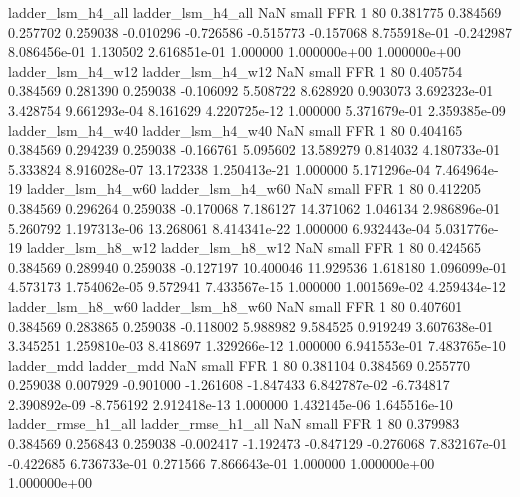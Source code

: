        ladder_lsm_h4_all        ladder_lsm_h4_all                   NaN      small      FFR                 1 80 0.381775       0.384569 0.257702       0.259038   -0.010296     -0.726586     -0.515773    -0.157068   8.755918e-01 -0.242987 8.086456e-01     1.130502   2.616851e-01            1.000000    1.000000e+00        1.000000e+00
       ladder_lsm_h4_w12        ladder_lsm_h4_w12                   NaN      small      FFR                 1 80 0.405754       0.384569 0.281390       0.259038   -0.106092      5.508722      8.628920     0.903073   3.692323e-01  3.428754 9.661293e-04     8.161629   4.220725e-12            1.000000    5.371679e-01        2.359385e-09
       ladder_lsm_h4_w40        ladder_lsm_h4_w40                   NaN      small      FFR                 1 80 0.404165       0.384569 0.294239       0.259038   -0.166761      5.095602     13.589279     0.814032   4.180733e-01  5.333824 8.916028e-07    13.172338   1.250413e-21            1.000000    5.171296e-04        7.464964e-19
       ladder_lsm_h4_w60        ladder_lsm_h4_w60                   NaN      small      FFR                 1 80 0.412205       0.384569 0.296264       0.259038   -0.170068      7.186127     14.371062     1.046134   2.986896e-01  5.260792 1.197313e-06    13.268061   8.414341e-22            1.000000    6.932443e-04        5.031776e-19
       ladder_lsm_h8_w12        ladder_lsm_h8_w12                   NaN      small      FFR                 1 80 0.424565       0.384569 0.289940       0.259038   -0.127197     10.400046     11.929536     1.618180   1.096099e-01  4.573173 1.754062e-05     9.572941   7.433567e-15            1.000000    1.001569e-02        4.259434e-12
       ladder_lsm_h8_w60        ladder_lsm_h8_w60                   NaN      small      FFR                 1 80 0.407601       0.384569 0.283865       0.259038   -0.118002      5.988982      9.584525     0.919249   3.607638e-01  3.345251 1.259810e-03     8.418697   1.329266e-12            1.000000    6.941553e-01        7.483765e-10
              ladder_mdd               ladder_mdd                   NaN      small      FFR                 1 80 0.381104       0.384569 0.255770       0.259038    0.007929     -0.901000     -1.261608    -1.847433   6.842787e-02 -6.734817 2.390892e-09    -8.756192   2.912418e-13            1.000000    1.432145e-06        1.645516e-10
      ladder_rmse_h1_all       ladder_rmse_h1_all                   NaN      small      FFR                 1 80 0.379983       0.384569 0.256843       0.259038   -0.002417     -1.192473     -0.847129    -0.276068   7.832167e-01 -0.422685 6.736733e-01     0.271566   7.866643e-01            1.000000    1.000000e+00        1.000000e+00
